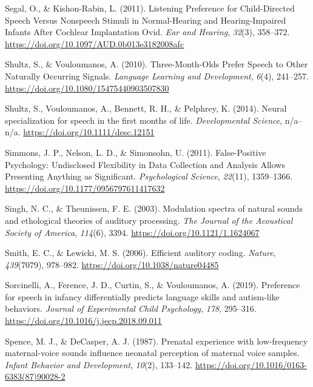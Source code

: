 \documentclass[man]{apa6}
\begin{document}
\leavevmode\hypertarget{ref-segal_listening_2011}{}%
Segal, O., \& Kishon-Rabin, L. (2011). Listening Preference for Child-Directed Speech Versus Nonspeech Stimuli in Normal-Hearing and Hearing-Impaired Infants After Cochlear Implantation Ovid. \emph{Ear and Hearing}, \emph{32}(3), 358--372. \url{https://doi.org/10.1097/AUD.0b013e3182008afc}

\leavevmode\hypertarget{ref-shultz_three-month-olds_2010}{}%
Shultz, S., \& Vouloumanos, A. (2010). Three-Month-Olds Prefer Speech to Other Naturally Occurring Signals. \emph{Language Learning and Development}, \emph{6}(4), 241--257. \url{https://doi.org/10.1080/15475440903507830}

\leavevmode\hypertarget{ref-shultz_neural_2014}{}%
Shultz, S., Vouloumanos, A., Bennett, R. H., \& Pelphrey, K. (2014). Neural specialization for speech in the first months of life. \emph{Developmental Science}, n/a--n/a. \url{https://doi.org/10.1111/desc.12151}

\leavevmode\hypertarget{ref-simmons_false-positive_2011}{}%
Simmons, J. P., Nelson, L. D., \& Simonsohn, U. (2011). False-Positive Psychology: Undisclosed Flexibility in Data Collection and Analysis Allows Presenting Anything as Significant. \emph{Psychological Science}, \emph{22}(11), 1359--1366. \url{https://doi.org/10.1177/0956797611417632}

\leavevmode\hypertarget{ref-singh_modulation_2003}{}%
Singh, N. C., \& Theunissen, F. E. (2003). Modulation spectra of natural sounds and ethological theories of auditory processing. \emph{The Journal of the Acoustical Society of America}, \emph{114}(6), 3394. \url{https://doi.org/10.1121/1.1624067}

\leavevmode\hypertarget{ref-smith_efficient_2006}{}%
Smith, E. C., \& Lewicki, M. S. (2006). Efficient auditory coding. \emph{Nature}, \emph{439}(7079), 978--982. \url{https://doi.org/10.1038/nature04485}

\leavevmode\hypertarget{ref-sorcinelli_preference_2019}{}%
Sorcinelli, A., Ference, J. D., Curtin, S., \& Vouloumanos, A. (2019). Preference for speech in infancy differentially predicts language skills and autism-like behaviors. \emph{Journal of Experimental Child Psychology}, \emph{178}, 295--316. \url{https://doi.org/10.1016/j.jecp.2018.09.011}

\leavevmode\hypertarget{ref-spence_prenatal_1987}{}%
Spence, M. J., \& DeCasper, A. J. (1987). Prenatal experience with low-frequency maternal-voice sounds influence neonatal perception of maternal voice samples. \emph{Infant Behavior and Development}, \emph{10}(2), 133--142. \url{https://doi.org/10.1016/0163-6383(87)90028-2}
\end{document}
